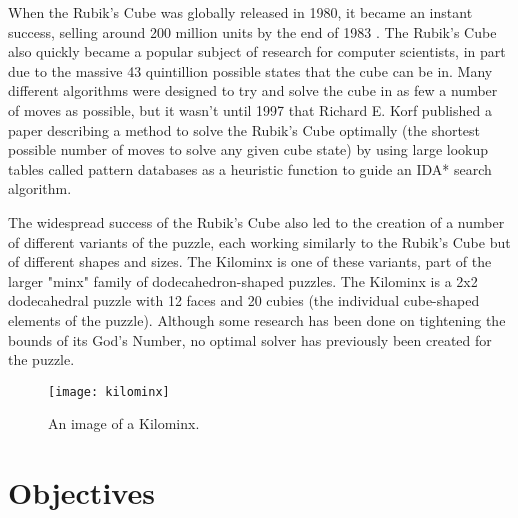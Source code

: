 
When the Rubik's Cube was globally released in 1980, it became an instant success, selling around 200 million units by the end of 1983 \cite{unitssold}. The Rubik's Cube also quickly became a popular subject of research for computer scientists, in part due to the massive 43 quintillion possible states \cite{states} that the cube can be in. Many different algorithms were designed to try and solve the cube in as few a number of moves as possible, but it wasn't until 1997 that Richard E. Korf published a paper \cite{korf} describing a method to solve the Rubik's Cube optimally (the shortest possible number of moves to solve any given cube state) by using large lookup tables called pattern databases\cite{patterndatabases} as a heuristic function to guide an IDA* search algorithm. 


The widespread success of the Rubik's Cube also led to the creation of a number of different variants of the puzzle, each working similarly to the Rubik's Cube but of different shapes and sizes. The Kilominx is one of these variants, part of the larger "minx" family of dodecahedron-shaped puzzles. The Kilominx is a 2x2 dodecahedral puzzle with 12 faces and 20 cubies (the individual cube-shaped elements of the puzzle). Although some research has been done on tightening the bounds of its God's Number, no optimal solver has previously been created for the puzzle.

\begin{figure}[h]
    \texttt{[image: kilominx]}
    \centering
    \caption{An image of a Kilominx.}
\end{figure}

\section{Objectives}